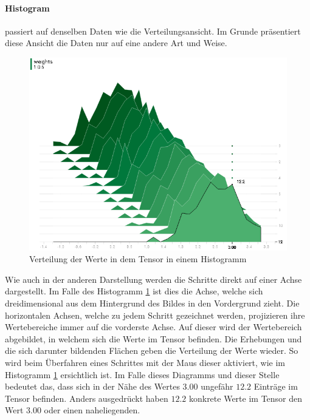 

\paragraph{Histogram} passiert auf denselben Daten wie die Verteilungsansicht. 
Im Grunde präsentiert diese Ansicht die Daten nur auf eine andere Art und Weise. 
\begin{figure}
	\centering
	\includegraphics[scale=0.7]{images/histogram-value.png}
	\caption{Verteilung der Werte in dem Tensor in einem Histogramm}
	\label{fig:Histogram}
\end{figure}
Wie auch in der anderen Darstellung werden die Schritte direkt auf einer Achse dargestellt. 
Im Falle des Histogramm \ref{fig:Histogram} ist dies die Achse, welche sich dreidimensional aus dem Hintergrund des Bildes in den Vordergrund zieht. 
Die horizontalen Achsen, welche zu jedem Schritt gezeichnet werden, projizieren ihre Wertebereiche immer auf die vorderste Achse. 
Auf dieser wird der Wertebereich abgebildet, in welchem sich die Werte im Tensor befinden. 
Die Erhebungen und die sich darunter bildenden Flächen geben die Verteilung der Werte wieder. 
So wird beim Überfahren eines Schrittes mit der Maus dieser aktiviert, wie im Histogramm \ref{fig:Histogram} ersichtlich ist. 
Im Falle dieses Diagramms und dieser Stelle bedeutet das, dass sich in der Nähe des Wertes $3.00$ ungefähr $12.2$ Einträge im Tensor befinden. 
Anders ausgedrückt haben $12.2$ konkrete Werte im Tensor den Wert $3.00$ oder einen naheliegenden. 
